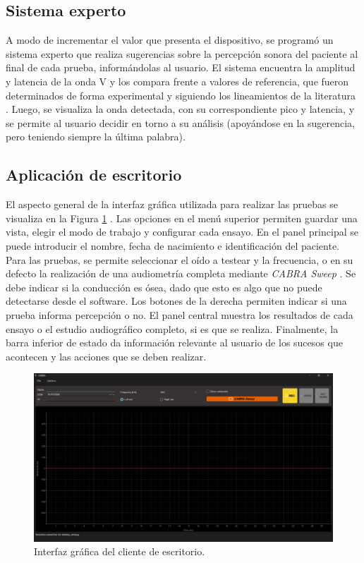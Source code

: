 \subsection{Sistema experto}

A modo de incrementar el valor que presenta el dispositivo, se programó un sistema experto que realiza sugerencias sobre
la percepción sonora del paciente al final de cada prueba, informándolas al usuario. El sistema encuentra la amplitud y
latencia de la onda V y los compara frente a valores de referencia, que fueron determinados de forma experimental y
siguiendo los lineamientos de la literatura \cite{husain_guideline_2008}
. Luego, se visualiza la onda detectada, con su correspondiente pico y latencia, y se permite al usuario decidir en
torno a su análisis (apoyándose en la sugerencia, pero teniendo siempre la última palabra).

\subsection{Aplicación de escritorio}

El aspecto general de la interfaz gráfica utilizada para realizar las pruebas se visualiza en la Figura
\ref{fig:UI-general-view}
. Las opciones en el menú superior permiten guardar una vista, elegir el modo de trabajo y configurar cada ensayo. En el
panel principal se puede introducir el nombre, fecha de nacimiento e identificación del paciente. Para las pruebas, se
permite seleccionar el oído a testear y la frecuencia, o en su defecto la realización de una audiometría completa
mediante \textit{CABRA Sweep}
. Se debe indicar si la conducción es ósea, dado que esto es algo que no puede detectarse desde el software. Los botones
de la derecha permiten indicar si una prueba informa percepción o no. El panel central muestra los resultados de cada
ensayo o el estudio audiográfico completo, si es que se realiza. Finalmente, la barra inferior de estado da información
relevante al usuario de los sucesos que acontecen y las acciones que se deben realizar.

\begin{figure}[H]
    \centering
    \includegraphics[width=1\linewidth]{figuras/UI-general-view.png}
    \caption{Interfaz gráfica del cliente de escritorio.}
    \label{fig:UI-general-view}
\end{figure}

